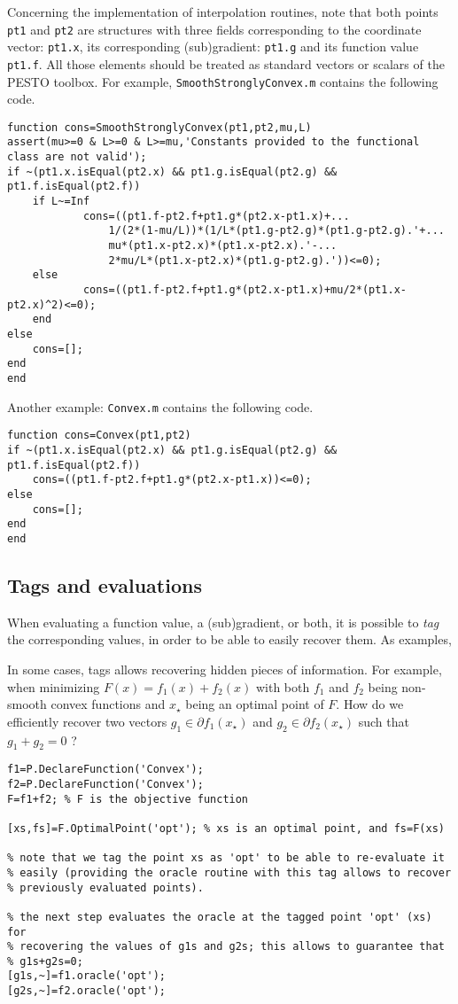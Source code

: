 \documentclass[11pt,a4paper]{article}
\begin{document}
					Concerning the implementation of interpolation routines, note that both points \verb?pt1? and \verb?pt2? are structures with three fields corresponding to the coordinate vector: \verb?pt1.x?, its corresponding (sub)gradient: \verb?pt1.g? and its function value \verb?pt1.f?. All those elements should be treated as standard vectors or scalars of the PESTO toolbox. For example, \verb?SmoothStronglyConvex.m? contains the following code.\\[-1cm]

					\begin{lstlisting}
function cons=SmoothStronglyConvex(pt1,pt2,mu,L)
assert(mu>=0 & L>=0 & L>=mu,'Constants provided to the functional class are not valid');
if ~(pt1.x.isEqual(pt2.x) && pt1.g.isEqual(pt2.g) && pt1.f.isEqual(pt2.f))
	if L~=Inf
			cons=((pt1.f-pt2.f+pt1.g*(pt2.x-pt1.x)+...
				1/(2*(1-mu/L))*(1/L*(pt1.g-pt2.g)*(pt1.g-pt2.g).'+...
				mu*(pt1.x-pt2.x)*(pt1.x-pt2.x).'-...
				2*mu/L*(pt1.x-pt2.x)*(pt1.g-pt2.g).'))<=0);
	else
			cons=((pt1.f-pt2.f+pt1.g*(pt2.x-pt1.x)+mu/2*(pt1.x-pt2.x)^2)<=0);
	end
else
	cons=[];
end
end
					\end{lstlisting}
					Another example: \verb?Convex.m? contains the following code.\\[-1cm]
					\begin{lstlisting}
function cons=Convex(pt1,pt2)
if ~(pt1.x.isEqual(pt2.x) && pt1.g.isEqual(pt2.g) && pt1.f.isEqual(pt2.f))
	cons=((pt1.f-pt2.f+pt1.g*(pt2.x-pt1.x))<=0);
else
	cons=[];
end
end
					\end{lstlisting}
					\newpage
					\subsection{Tags and evaluations}\label{sec:tags}
					When evaluating a function value, a (sub)gradient, or both, it is possible to \emph{tag} the corresponding values, in order to be able to easily recover them. As examples,


					In some cases, tags allows recovering hidden pieces of information. For example, when minimizing $F(x)=f_1(x)+f_2(x)$ with both $f_1$ and $f_2$ being non-smooth convex functions and $x_\star$ being an optimal point of $F$.  How do we efficiently recover two vectors $g_1\in\partial f_1(x_\star)$ and $g_2\in\partial f_2(x_\star)$ such that $g_1+g_2=0$ ?\\[-1cm]
					\begin{lstlisting}
f1=P.DeclareFunction('Convex');
f2=P.DeclareFunction('Convex');
F=f1+f2; % F is the objective function

[xs,fs]=F.OptimalPoint('opt'); % xs is an optimal point, and fs=F(xs)

% note that we tag the point xs as 'opt' to be able to re-evaluate it
% easily (providing the oracle routine with this tag allows to recover
% previously evaluated points).

% the next step evaluates the oracle at the tagged point 'opt' (xs) for
% recovering the values of g1s and g2s; this allows to guarantee that
% g1s+g2s=0;
[g1s,~]=f1.oracle('opt');
[g2s,~]=f2.oracle('opt');
					\end{lstlisting}
\end{document}
